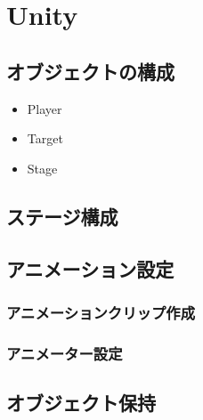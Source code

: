 \documentclass{ltjsreport}
\begin{document}
	\section{Unity}
		\subsection{オブジェクトの構成}
			\begin{itemize}
				\item Player
				\item Target
				\item Stage
			\end{itemize}
		\subsection{ステージ構成}
		\subsection{アニメーション設定}
			\subsubsection{アニメーションクリップ作成}
			\subsubsection{アニメーター設定}
		\subsection{オブジェクト保持}

		
\end{document}
